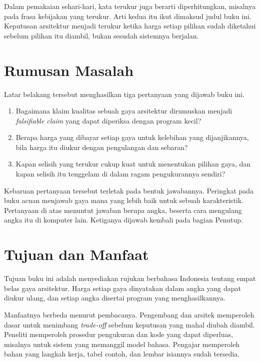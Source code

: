Dalam pemakaian sehari-hari, kata terukur juga berarti diperhitungkan, misalnya
pada frasa kebijakan yang terukur. Arti kedua itu ikut dimaksud judul buku ini.
Keputusan arsitektur menjadi terukur ketika harga setiap pilihan sudah diketahui
sebelum pilihan itu diambil, bukan sesudah sistemnya berjalan.

\section*{Rumusan Masalah}

Latar belakang tersebut menghasilkan tiga pertanyaan yang dijawab buku ini.

\begin{enumerate}
  \item Bagaimana klaim kualitas sebuah gaya arsitektur dirumuskan menjadi
        \textit{falsifiable claim} yang dapat diperiksa dengan program kecil?
  \item Berapa harga yang dibayar setiap gaya untuk kelebihan yang
        dijanjikannya, bila harga itu diukur dengan pengulangan dan sebaran?
  \item Kapan selisih yang terukur cukup kuat untuk menentukan pilihan gaya,
        dan kapan selisih itu tenggelam di dalam ragam pengukurannya sendiri?
\end{enumerate}

Kebaruan pertanyaan tersebut terletak pada bentuk jawabannya. Peringkat pada
buku acuan menjawab gaya mana yang lebih baik untuk sebuah karakteristik.
Pertanyaan di atas menuntut jawaban berupa angka, beserta cara mengulang angka
itu di komputer lain. Ketiganya dijawab kembali pada bagian Penutup.

\section*{Tujuan dan Manfaat}

Tujuan buku ini adalah menyediakan rujukan berbahasa Indonesia tentang empat
belas gaya arsitektur. Harga setiap gaya dinyatakan dalam angka yang dapat
diukur ulang, dan setiap angka disertai program yang menghasilkannya.

Manfaatnya berbeda menurut pembacanya. Pengembang dan arsitek memperoleh dasar
untuk menimbang \textit{trade-off} sebelum keputusan yang mahal diubah diambil.
Peneliti memperoleh prosedur pengukuran dan kode yang dapat diperluas, misalnya
untuk sistem yang memanggil model bahasa. Pengajar memperoleh bahan yang
langkah kerja, tabel contoh, dan lembar isiannya sudah tersedia.

